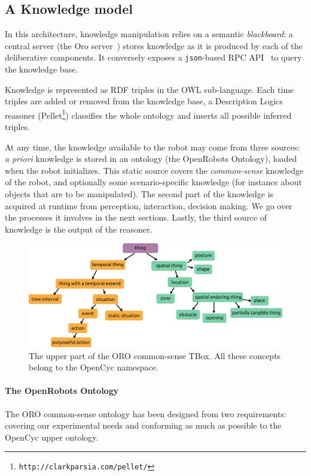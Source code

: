 \documentclass[preprint,3p,times]{elsarticle}
\begin{document}
\subsection{A Knowledge model}

In this architecture, knowledge manipulation relies on a
semantic \emph{blackboard}: a central server (the {\sc Oro}
server~\cite{Lemaignan2010}) stores knowledge as it is produced by each of the
deliberative components. It conversely exposes a {\tt json}-based RPC
API~\cite{lemaignan2012kbapi} to query the knowledge base.

Knowledge is represented as RDF triples in the OWL sub-language. Each
time triples are added or removed from the knowledge base, a Description
Logics reasoner ({\sc Pellet}\footnote{\tt http://clarkparsia.com/pellet/})
classifies the whole ontology and inserts all possible inferred triples.

At any time, the knowledge available to the robot may come from three sources:
{\it a priori} knowledge is stored in an ontology (the {\sc OpenRobots Ontology}),
loaded when the robot initializes. This static source covers the
\emph{common-sense} knowledge of the robot, and optionally some
scenario-specific knowledge (for instance about objects that are to be
manipulated). The second part of the knowledge is acquired at runtime from
perception, interaction, decision making.  We go over the processes it involves
in the next sections. Lastly, the third source of knowledge is the output of the
reasoner.

\begin{figure}
    \centering
    \includegraphics[width=\columnwidth]{top_tbox.pdf}

    \caption{The upper part of the ORO common-sense TBox. All these concepts
    belong to the {\sc OpenCyc} namespace.}
    
    \label{fig|upper_tbox}
\end{figure}

\paragraph{The OpenRobots Ontology} The ORO common-sense ontology has been designed from two requirements: covering
our experimental needs and conforming as much as possible to the {\sc OpenCyc}
upper ontology.
\end{document}
